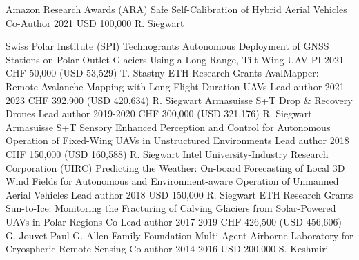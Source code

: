 \label{sec:funding}

\begin{cventries}

\begin{flushleft}
\end{flushleft}
	
\cvgrantentry
	{Amazon Research Awards (ARA)} %
	{Safe Self-Calibration of Hybrid Aerial Vehicles} %
	{Co-Author} %
	{2021} %
	{USD 100,000} %
	{R. Siegwart} %
\begin{flushleft}
\end{flushleft}

\cvgrantentry
	{Swiss Polar Institute (SPI) Technogrants} %
	{Autonomous Deployment of GNSS Stations on Polar Outlet Glaciers Using a Long-Range, Tilt-Wing UAV} %
	{PI} %
	{2021} %
	{CHF 50,000 (USD 53,529)} %
	{T. Stastny} %
%
\cvgrantentry
	{ETH Research Grants} %
	{AvalMapper: Remote Avalanche Mapping with Long Flight Duration UAVs} %
	{Lead author} %
	{2021-2023} %
	{CHF 392,900 (USD 420,634)} %
	{R. Siegwart} %
%
\cvgrantentry
	{Armasuisse S+T} %
	{Drop \& Recovery Drones} %
	{Lead author} %
	{2019-2020} %
	{CHF 300,000 (USD 321,176)} %
	{R. Siegwart} %
%
\cvgrantentry
	{Armasuisse S+T} %
	{Sensory Enhanced Perception and Control for Autonomous Operation of Fixed-Wing UAVs in Unstructured Environments} %
	{Lead author} %
	{2018} %
	{CHF 150,000 (USD 160,588)} %
	{R. Siegwart} %
%	
\cvgrantentry
	{Intel University-Industry Research Corporation (UIRC)} %
	{Predicting the Weather: On-board Forecasting of Local 3D Wind Fields for Autonomous and Environment-aware Operation of Unmanned Aerial Vehicles} %
	{Lead author} %
	{2018} %
	{USD 150,000} %
	{R. Siegwart} %
%	
\cvgrantentry
	{ETH Research Grants} %
	{Sun-to-Ice: Monitoring the Fracturing of Calving Glaciers from Solar-Powered UAVs in Polar Regions} %
	{Co-Lead author} %
	{2017-2019} %
	{CHF 426,500 (USD 456,606)} %
	{G. Jouvet} %
%	
\cvgrantentry
	{Paul G. Allen Family Foundation} %
	{Multi-Agent Airborne Laboratory for Cryospheric Remote Sensing} %
	{Co-author} %
	{2014-2016} %
	{USD 200,000} %
	{S. Keshmiri} %
    
\end{cventries}



